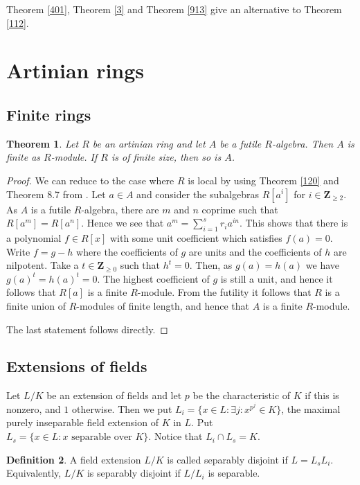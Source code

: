 \documentclass{amsart}
\theoremstyle{plain}
\newtheorem{theorem}{Theorem}[section]
\theoremstyle{definition}
\newtheorem{definition}[theorem]{Definition}
\begin{document}
Theorem \ref{401}, Theorem \ref{3} and Theorem \ref{913} give an alternative to Theorem \ref{112}.

\section{Artinian rings} \label{1234}

\subsection{Finite rings}

\begin{theorem} \label{31} \label{2}
 Let $R$ be an artinian ring and let $A$ be a futile $R$-algebra. Then $A$ is finite as $R$-module. If $R$ is of finite size, then so is $A$. 
\end{theorem}
\begin{proof}
We can reduce to the case where $R$ is local by using Theorem \ref{120} and Theorem 8.7 from \cite{AT}. Let $a \in A$ and consider the
subalgebras $R[a^i]$ for $i \in {\mathbf{Z}}_{\geq 2}$. As $A$ is a futile $R$-algebra, there are $m$ and $n$ coprime such that
$R[a^m]=R[a^n]$. Hence we see that $a^m=\sum_{i=1}^s r_ia^{in}$. This shows that there is a polynomial $f \in R[x]$ with some unit coefficient which
satisfies $f(a)=0$. Write $f=g-h$ where the coefficients of $g$ are units and the coefficients of $h$ are nilpotent. Take a $t \in {\mathbf{Z}}_{\geq 0}$
such that $h^t=0$. Then, as $g(a)=h(a)$ we have $g(a)^t=h(a)^t=0$. The highest
coefficient of $g$ is still a unit, and hence it follows that $R[a]$ is a finite $R$-module. From the futility it follows that $R$ is a finite union
of $R$-modules of finite length, and hence that $A$ is a finite $R$-module.

The last statement follows directly.
\end{proof}

\subsection{Extensions of fields} \label{800}

Let $L/K$ be an extension of fields and let $p$ be the characteristic of $K$ if this is nonzero, and $1$ otherwise.
Then we put $L_i=\{x \in L: \exists j: x^{p^j} \in K\}$, the maximal purely inseparable field extension of $K$
in $L$. Put $L_s=\{x \in L: x \textrm{ separable over } K\}$. Notice that $L_i \cap L_s=K$. 

\begin{definition}
 A field extension $L/K$ is called separably disjoint if $L=L_sL_i$. Equivalently, $L/K$ is separably disjoint if $L/L_i$ is separable.
\end{definition}
\end{document}
